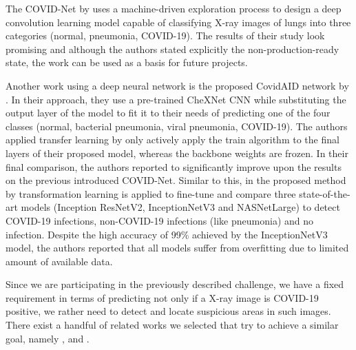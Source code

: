 The COVID-Net \autocite{wang2020covid} by \citeauthor{wang2020covid} uses a machine-driven exploration process to design a deep convolution learning model capable of classifying X-ray images of lungs into three categories (normal, pneumonia, COVID-19). The results of their study look promising and although the authors stated explicitly the non-production-ready state, the work can be used as a basis for future projects.

Another work using a deep neural network is the proposed CovidAID \autocite{mangal2020covidaid} network by \citeauthor{mangal2020covidaid}. In their approach, they use a pre-trained CheXNet \autocite{rajpurkar2017chexnet} \ac{CNN} while substituting the output layer of the model to fit it to their needs of predicting one of the four classes (normal, bacterial pneumonia, viral pneumonia, COVID-19). The authors applied transfer learning by only actively apply the train algorithm to the final layers of their proposed model, whereas the backbone weights are frozen.
In their final comparison, the authors reported to significantly improve upon the results on the previous introduced COVID-Net.
Similar to this, in the proposed method \autocite{CoronaDLTransfer} by \citeauthor{CoronaDLTransfer} transformation learning is applied to fine-tune and compare three state-of-the-art models (Inception ResNetV2, InceptionNetV3 and NASNetLarge) to detect COVID-19 infections, non-COVID-19 infections (like pneumonia) and no infection. Despite the high accuracy of 99\% achieved by the InceptionNetV3 model, the authors reported that all models suffer from overfitting due to limited amount of available data.

Since we are participating in the previously described challenge, we have a fixed requirement in terms of predicting not only if a X-ray image is COVID-19 positive, we rather need to detect and locate suspicious areas in such images. There exist a handful of related works we selected that try to achieve a similar goal, namely \autocite{brunese2020explainable}, \autocite{fan2020inf} and \autocite{al2021fast}.

